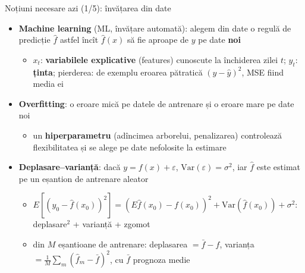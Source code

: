 \begin{frame}{Noțiuni necesare azi (1/5): învățarea din date}
\itemsize{\small}
\begin{itemize}
    \item \textbf{Machine learning} (ML, învățare automată): alegem din date o regulă de predicție $\hat f$ astfel încît $\hat f(x)$ să fie aproape de $y$ pe date \textbf{noi}
    \begin{itemize}
        \item $x_t$: \textbf{variabilele explicative} (features) cunoscute la închiderea zilei $t$; $y_t$: \textbf{ținta}; pierderea: de exemplu eroarea pătratică $(y - \hat y)^2$, MSE fiind media ei
    \end{itemize}
    \item \textbf{Overfitting}: o eroare mică pe datele de antrenare și o eroare mare pe date noi
    \begin{itemize}
        \item un \textbf{hiperparametru} (adîncimea arborelui, penalizarea) controlează flexibilitatea și se alege pe date nefolosite la estimare
    \end{itemize}
    \item \textbf{Deplasare--varianță}: dacă $y = f(x) + \varepsilon$, $\mathrm{Var}(\varepsilon) = \sigma^2$, iar $\hat f$ este estimat pe un eșantion de antrenare aleator
    \begin{itemize}
        \item $E[(y_0 - \hat f(x_0))^2] = (E\hat f(x_0) - f(x_0))^2 + \mathrm{Var}(\hat f(x_0)) + \sigma^2$: deplasare$^2$ + varianță + zgomot
        \item din $M$ eșantioane de antrenare: deplasarea $= \bar f - f$, varianța $= \frac1M\sum_m (\hat f_m - \bar f)^2$, cu $\bar f$ prognoza medie
    \end{itemize}
\end{itemize}
\end{frame}

